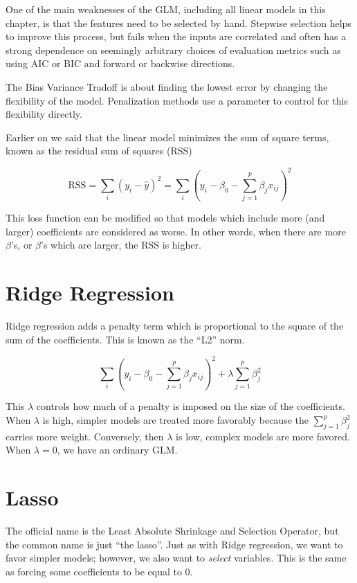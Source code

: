 \documentclass[openany]{book}
\begin{document}
One of the main weaknesses of the GLM, including all linear models in this chapter, is that the features need to be selected by hand. Stepwise selection helps to improve this process, but fails when the inputs are correlated and often has a strong dependence on seemingly arbitrary choices of evaluation metrics such as using AIC or BIC and forward or backwise directions.

The Bias Variance Tradoff is about finding the lowest error by changing the flexibility of the model. Penalization methods use a parameter to control for this flexibility directly.

Earlier on we said that the linear model minimizes the sum of square terms, known as the residual sum of squares (RSS)

\[
\text{RSS} = \sum_i(y_i - \hat{y})^2 = \sum_i(y_i - \beta_0 - \sum_{j = 1}^p\beta_j x_{ij})^2
\]

This loss function can be modified so that models which include more (and larger) coefficients are considered as worse. In other words, when there are more \(\beta\)'s, or \(\beta\)'s which are larger, the RSS is higher.

\hypertarget{ridge-regression}{%
\section{Ridge Regression}\label{ridge-regression}}

Ridge regression adds a penalty term which is proportional to the square of the sum of the coefficients. This is known as the ``L2'' norm.

\[
\sum_i(y_i - \beta_0 - \sum_{j = 1}^p\beta_j x_{ij})^2 + \lambda \sum_{j = 1}^p\beta_j^2
\]

This \(\lambda\) controls how much of a penalty is imposed on the size of the coefficients. When \(\lambda\) is high, simpler models are treated more favorably because the \(\sum_{j = 1}^p\beta_j^2\) carries more weight. Conversely, then \(\lambda\) is low, complex models are more favored. When \(\lambda = 0\), we have an ordinary GLM.

\hypertarget{lasso}{%
\section{Lasso}\label{lasso}}

The official name is the Least Absolute Shrinkage and Selection Operator, but the common name is just ``the lasso''. Just as with Ridge regression, we want to favor simpler models; however, we also want to \emph{select} variables. This is the same as forcing some coefficients to be equal to 0.
\end{document}
